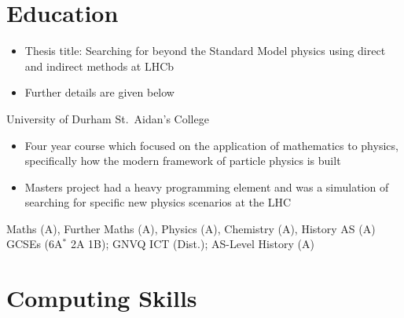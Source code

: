 
\section{Education}
{
  \begin{itemize}
    \item Thesis title:
      Searching for beyond the Standard Model physics using direct and indirect methods at
      LHCb
    \item Further details are given below
  \end{itemize}
}
{University of Durham {\color{color2} St.~Aidan's College}}{}{}
{
  \begin{itemize}
    \item Four year course which focused on the application of mathematics to physics, specifically
      how the modern framework of particle physics is built
    \item Masters project had a heavy programming element and was a simulation of searching for
      specific new physics scenarios at the LHC
  \end{itemize}
}
{Maths (A), Further Maths (A), Physics (A), Chemistry (A), History AS (A)}
{GCSEs (6A$\!^*$ 2A 1B); GNVQ ICT (Dist.); AS-Level History (A)}

\section{Computing Skills}


